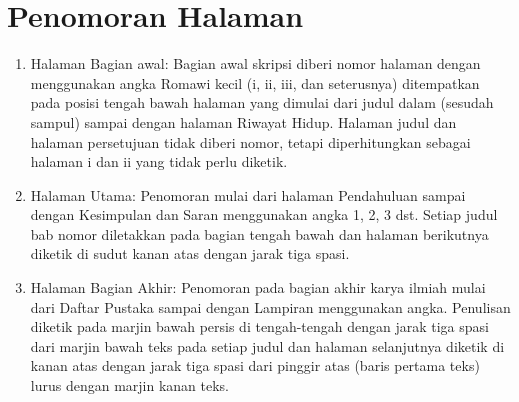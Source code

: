 \section{Penomoran Halaman}
\begin{enumerate}
\item Halaman Bagian awal:
Bagian awal skripsi diberi nomor halaman dengan menggunakan angka Romawi kecil (i,
ii, iii, dan seterusnya) ditempatkan pada posisi tengah bawah halaman yang dimulai dari judul
dalam (sesudah sampul) sampai dengan halaman Riwayat Hidup. Halaman judul dan halaman
persetujuan tidak diberi nomor, tetapi diperhitungkan sebagai halaman i dan ii yang tidak perlu
diketik.
\item Halaman Utama:
Penomoran mulai dari halaman Pendahuluan sampai dengan Kesimpulan dan Saran
menggunakan angka 1, 2, 3 dst. Setiap judul bab nomor diletakkan pada bagian tengah bawah dan
halaman berikutnya diketik di sudut kanan atas dengan jarak tiga spasi.
\item Halaman Bagian Akhir:
Penomoran pada bagian akhir karya ilmiah mulai dari Daftar Pustaka sampai dengan
Lampiran menggunakan angka. Penulisan diketik pada marjin bawah persis di tengah-tengah
dengan jarak tiga spasi dari marjin bawah teks pada setiap judul dan halaman selanjutnya diketik
di kanan atas dengan jarak tiga spasi dari pinggir atas (baris pertama teks) lurus dengan marjin
kanan teks.
\end{enumerate}
